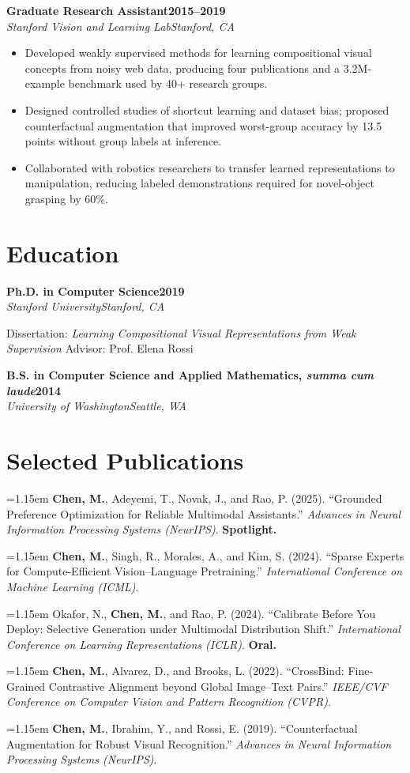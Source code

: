 \documentclass[10pt,letterpaper]{article}
\newcommand{\entry}[4]{%
  \textbf{#1}\hfill\textbf{#2}\\[-1pt]
  \textit{\color{Signal}#3}\hfill\textit{\color{Slate}#4}\par
}
\newcommand{\publication}[1]{%
  \hangindent=1.15em\hangafter=1 #1\par
}
\begin{document}
\entry{Graduate Research Assistant}{2015--2019}{Stanford Vision and Learning Lab}{Stanford, CA}
\begin{itemize}
  \item Developed weakly supervised methods for learning compositional visual concepts from noisy web data, producing four publications and a 3.2M-example benchmark used by 40+ research groups.
  \item Designed controlled studies of shortcut learning and dataset bias; proposed counterfactual augmentation that improved worst-group accuracy by 13.5 points without group labels at inference.
  \item Collaborated with robotics researchers to transfer learned representations to manipulation, reducing labeled demonstrations required for novel-object grasping by 60\%.
\end{itemize}

\newpage

\section*{Education}
\entry{Ph.D. in Computer Science}{2019}{Stanford University}{Stanford, CA}
Dissertation: \textit{Learning Compositional Visual Representations from Weak Supervision} \hfill Advisor: Prof. Elena Rossi
\vspace{3pt}

\entry{B.S. in Computer Science and Applied Mathematics, \textit{summa cum laude}}{2014}{University of Washington}{Seattle, WA}

\section*{Selected Publications}
{\small
\publication{\textbf{Chen, M.}, Adeyemi, T., Novak, J., and Rao, P. (2025). ``Grounded Preference Optimization for Reliable Multimodal Assistants.'' \textit{Advances in Neural Information Processing Systems (NeurIPS)}. \textbf{Spotlight.}}
\vspace{2.5pt}
\publication{\textbf{Chen, M.}, Singh, R., Morales, A., and Kim, S. (2024). ``Sparse Experts for Compute-Efficient Vision--Language Pretraining.'' \textit{International Conference on Machine Learning (ICML)}.}
\vspace{2.5pt}
\publication{Okafor, N., \textbf{Chen, M.}, and Rao, P. (2024). ``Calibrate Before You Deploy: Selective Generation under Multimodal Distribution Shift.'' \textit{International Conference on Learning Representations (ICLR)}. \textbf{Oral.}}
\vspace{2.5pt}
\publication{\textbf{Chen, M.}, Alvarez, D., and Brooks, L. (2022). ``CrossBind: Fine-Grained Contrastive Alignment beyond Global Image--Text Pairs.'' \textit{IEEE/CVF Conference on Computer Vision and Pattern Recognition (CVPR)}.}
\vspace{2.5pt}
\publication{\textbf{Chen, M.}, Ibrahim, Y., and Rossi, E. (2019). ``Counterfactual Augmentation for Robust Visual Recognition.'' \textit{Advances in Neural Information Processing Systems (NeurIPS)}.}
}
\end{document}
